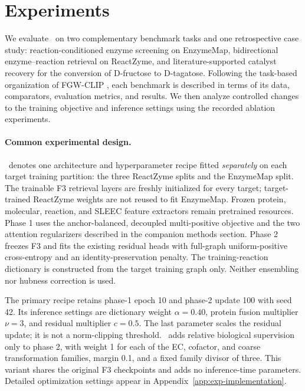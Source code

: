 \section{Experiments}
\label{sec:exp}

We evaluate \methodname\ on two complementary benchmark tasks and one
retrospective case study: reaction-conditioned enzyme screening on EnzymeMap,
bidirectional enzyme--reaction retrieval on ReactZyme, and literature-supported
catalyst recovery for the conversion of D-fructose to D-tagatose. Following the
task-based organization of FGW-CLIP \citep{zhou2026fgwclip}, each benchmark is
described in terms of its data, comparators, evaluation metrics, and results.
We then analyze controlled changes to the training objective and inference
settings using the recorded ablation experiments.

\paragraph{Common experimental design.}
\methodname\ denotes one architecture and hyperparameter recipe fitted
\emph{separately} on each target training partition: the three ReactZyme splits
and the EnzymeMap split. The trainable F3 retrieval layers are freshly
initialized for every target; target-trained ReactZyme weights are not reused
to fit EnzymeMap. Frozen protein, molecular, reaction, and SLEEC feature
extractors remain pretrained resources. Phase 1 uses the anchor-balanced,
decoupled multi-positive objective and the two attention regularizers described
in the companion methods section. Phase 2 freezes F3 and fits the existing
residual heads with full-graph uniform-positive cross-entropy and an
identity-preservation penalty. The training-reaction dictionary is constructed
from the target training graph only. Neither ensembling nor hubness correction
is used.

The primary recipe retains phase-1 epoch 10 and phase-2 update 100 with seed
42. Its inference settings are dictionary weight $\alpha=0.40$, protein fusion
multiplier $\nu=3$, and residual multiplier $c=0.5$. The last parameter scales
the residual update; it is not a norm-clipping threshold. \vfourBio\ adds
relative biological supervision only to phase 2, with weight 1 for each of
the EC, cofactor, and coarse transformation families, margin 0.1, and a fixed
family divisor of three. This variant shares the original F3 checkpoints and
adds no inference-time parameters. Detailed optimization settings appear in
Appendix~\ref{app:exp-implementation}.

